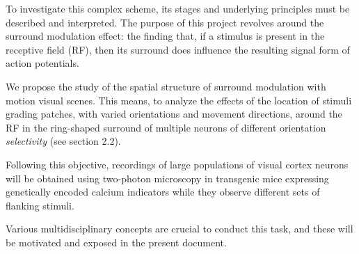 
To investigate this complex scheme, its stages and underlying principles must be described and interpreted. 
The purpose of this project revolves around the surround modulation effect: the finding that, if a stimulus is present in the receptive field (RF), then its surround does influence the resulting signal form of action potentials. 

We propose the study of the spatial structure of surround modulation with motion visual scenes. This means, to analyze the effects of the location of stimuli grading patches, with varied orientations and movement directions, around the RF in the ring-shaped surround of multiple neurons of different orientation \textit{selectivity} (see section 2.2).

Following this objective, recordings of large populations of visual cortex neurons will be obtained using two-photon microscopy in transgenic mice expressing genetically encoded calcium indicators while they observe different sets of flanking stimuli. 

Various multidisciplinary concepts are crucial to conduct this task, and these will be motivated and exposed in the present document.

